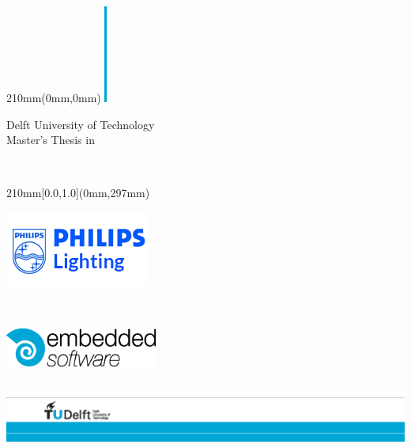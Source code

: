 
\begin {textblock*}{210mm}(0mm,0mm)
\noindent
\includegraphics[height=3.2cm]{pics/block}
\sffamily
\vspace{.8cm}
\begin{center}
\Large
Delft University of Technology\\
Master's Thesis in \reportMSC\\
\vspace{2cm}
\parbox{170mm}{\bfseries\centering\Huge\reportTitle}\\
\vspace{1cm}
\parbox{170mm}{\bfseries\centering\reportAuthor}

\end{center}
\end{textblock*}

\begin {textblock*}{210mm}[0.0,1.0](0mm,297mm)
\noindent
\hspace{1.5cm}
\hfill\parbox{5cm}{
\includegraphics[scale=1]{pics/philips_lighting.png}}
\hspace*{2cm}\\

\vspace*{1cm}

\hfill\parbox{5cm}{
\includegraphics[width=5cm]{pics/es_logo_cyan_black_rgb}}
\hspace*{2cm}\\

\vspace*{1.5cm}
\noindent
\includegraphics[width=\textwidth]{pics/TU_border_A4_L_front}
\end{textblock*}

\null\newpage
